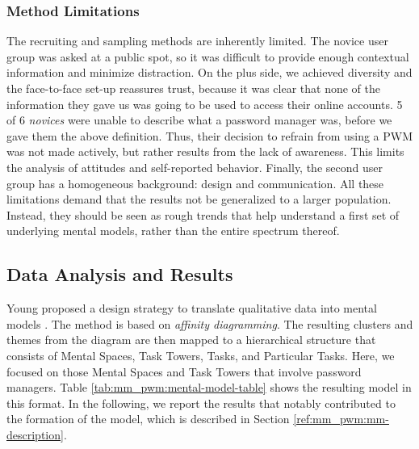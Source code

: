 \subsubsection{Method Limitations}
The recruiting and sampling methods are inherently limited. The novice user group was asked at a public spot, so it was difficult to provide enough contextual information and minimize distraction. On the plus side, we achieved diversity and the face-to-face set-up reassures trust, because it was clear that none of the information they gave us was going to be used to access their online accounts. 5 of 6 \textit{novices} were unable to describe what a password manager was, before we gave them the above definition. Thus, their decision to refrain from using a \gls{PWM} was not made actively, but rather results from the lack of awareness. This limits the analysis of attitudes and self-reported behavior. Finally, the second user group has a homogeneous background: design and communication. All these limitations demand that the results not be generalized to a larger population. Instead, they should be seen as rough trends that help understand a first set of underlying mental models, rather than the entire spectrum thereof.

\subsection{Data Analysis and Results}
Young proposed a design strategy to translate qualitative data into mental models \cite{Young2008}. The method is based on \textit{affinity diagramming}. The resulting clusters and themes from the diagram are then mapped to a hierarchical structure that consists of Mental Spaces, Task Towers, Tasks, and Particular Tasks. Here, we focused on those Mental Spaces and Task Towers that involve password managers. Table \ref{tab:mm_pwm:mental-model-table} shows the resulting model in this format. In the following, we report the results that notably contributed to the formation of the model, which is described in Section \ref{ref:mm_pwm:mm-description}.



